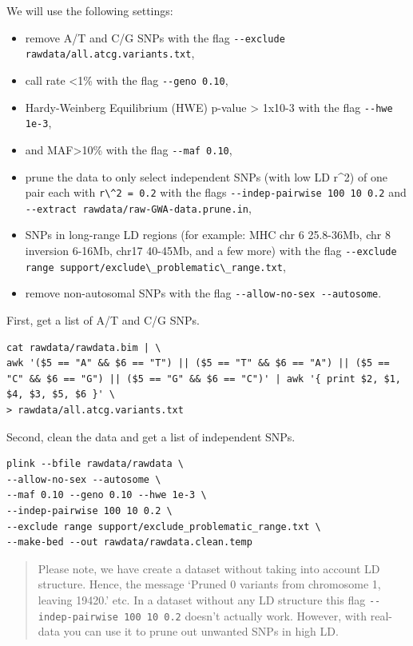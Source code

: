 \documentclass[
]{book}
\newcommand{\passthrough}[1]{#1}
\providecommand{\tightlist}{%
  \setlength{\itemsep}{0pt}\setlength{\parskip}{0pt}}
\begin{document}
We will use the following settings:

\begin{itemize}
\tightlist
\item
  remove A/T and C/G SNPs with the flag \passthrough{\lstinline!--exclude rawdata/all.atcg.variants.txt!},
\item
  call rate \textless1\% with the flag \passthrough{\lstinline!--geno 0.10!},
\item
  Hardy-Weinberg Equilibrium (HWE) p-value \textgreater{} 1x10-3 with the flag \passthrough{\lstinline!--hwe 1e-3!},
\item
  and MAF\textgreater10\% with the flag \passthrough{\lstinline!--maf 0.10!},
\item
  prune the data to only select independent SNPs (with low LD r\^{}2) of one pair each with \passthrough{\lstinline!r\^2 = 0.2!} with the flags \passthrough{\lstinline!--indep-pairwise 100 10 0.2!} and \passthrough{\lstinline!--extract rawdata/raw-GWA-data.prune.in!},
\item
  SNPs in long-range LD regions (for example: MHC chr 6 25.8-36Mb, chr 8 inversion 6-16Mb, chr17 40-45Mb, and a few more) with the flag \passthrough{\lstinline!--exclude range support/exclude\_problematic\_range.txt!},
\item
  remove non-autosomal SNPs with the flag \passthrough{\lstinline!--allow-no-sex --autosome!}.
\end{itemize}

First, get a list of A/T and C/G SNPs.

\begin{lstlisting}
cat rawdata/rawdata.bim | \
awk '($5 == "A" && $6 == "T") || ($5 == "T" && $6 == "A") || ($5 == "C" && $6 == "G") || ($5 == "G" && $6 == "C")' | awk '{ print $2, $1, $4, $3, $5, $6 }' \
> rawdata/all.atcg.variants.txt
\end{lstlisting}

Second, clean the data and get a list of independent SNPs.

\begin{lstlisting}
plink --bfile rawdata/rawdata \
--allow-no-sex --autosome \
--maf 0.10 --geno 0.10 --hwe 1e-3 \
--indep-pairwise 100 10 0.2 \
--exclude range support/exclude_problematic_range.txt \
--make-bed --out rawdata/rawdata.clean.temp
\end{lstlisting}

\begin{quote}
Please note, we have create a dataset without taking into account LD structure. Hence, the message `Pruned 0 variants from chromosome 1, leaving 19420.' etc. In a dataset without any LD structure this flag \passthrough{\lstinline!--indep-pairwise 100 10 0.2!} doesn't actually work. However, with real-data you can use it to prune out unwanted SNPs in high LD.
\end{quote}
\end{document}
